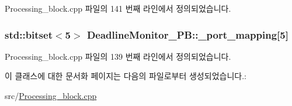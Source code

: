 Processing\+\_\+block.\+cpp 파일의 141 번째 라인에서 정의되었습니다.

\subsubsection[{\texorpdfstring{\+\_\+port\+\_\+mapping}{_port_mapping}}]{\setlength{\rightskip}{0pt plus 5cm}std\+::bitset$<$5$>$ Deadline\+Monitor\+\_\+\+P\+B\+::\+\_\+port\+\_\+mapping\mbox{[}5\mbox{]}\hspace{0.3cm}{\ttfamily [private]}}\hypertarget{classDeadlineMonitor__PB_a86839dadce69f56fba6589355b56513d}{}\label{classDeadlineMonitor__PB_a86839dadce69f56fba6589355b56513d}


Processing\+\_\+block.\+cpp 파일의 139 번째 라인에서 정의되었습니다.



이 클래스에 대한 문서화 페이지는 다음의 파일로부터 생성되었습니다.\+:\begin{DoxyCompactItemize}
\item 
src/\hyperlink{Processing__block_8cpp}{Processing\+\_\+block.\+cpp}\end{DoxyCompactItemize}
